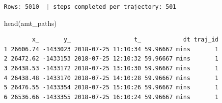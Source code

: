 \documentclass[
  letterpaper,
  DIV=11,
  numbers=noendperiod]{scrartcl}
\newenvironment{Shaded}{\begin{snugshade}}{\end{snugshade}}
\newcommand{\FunctionTok}[1]{\textcolor[rgb]{0.28,0.35,0.67}{#1}}
\newcommand{\NormalTok}[1]{\textcolor[rgb]{0.00,0.23,0.31}{#1}}
\begin{document}
\begin{verbatim}
Rows: 5010  | steps completed per trajectory: 501 
\end{verbatim}

\begin{Shaded}
\begin{Highlighting}[]
\FunctionTok{head}\NormalTok{(amt\_paths)}
\end{Highlighting}
\end{Shaded}

\begin{verbatim}
        x_       y_                  t_            dt traj_id
1 26606.74 -1433023 2018-07-25 11:10:34 59.96667 mins       1
2 26472.62 -1433153 2018-07-25 12:10:32 59.96667 mins       1
3 26438.53 -1433172 2018-07-25 13:10:30 59.96667 mins       1
4 26438.48 -1433170 2018-07-25 14:10:28 59.96667 mins       1
5 26476.55 -1433354 2018-07-25 15:10:26 59.96667 mins       1
6 26536.66 -1433355 2018-07-25 16:10:24 59.96667 mins       1
\end{verbatim}
\end{document}

